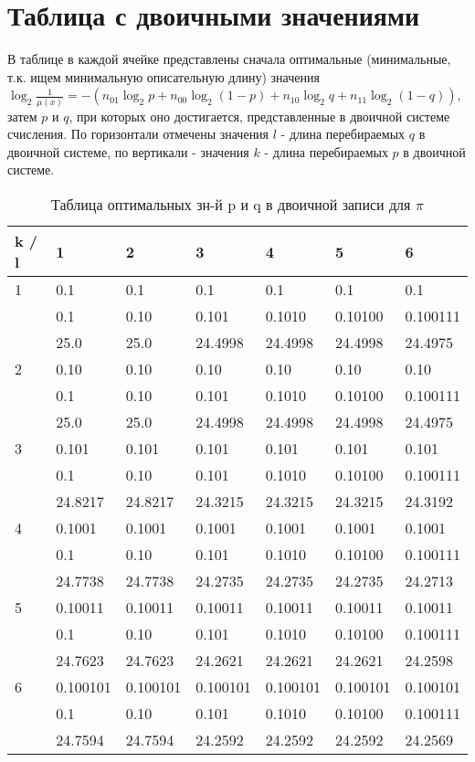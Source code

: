 \documentclass[12pt]{article}
\begin{document}
	
	\section*{Таблица с двоичными значениями}
	В таблице в каждой ячейке представлены сначала оптимальные (минимальные, т.к. ищем минимальную описательную длину) значения $\log_2{\frac{1}{\mu(x)}}=-(n_{01}\log_2{p}+n_{00}\log_2{(1-p)}+n_{10}\log_2{q}+n_{11}\log_2{(1-q)})$, затем $p$ и $q$, при которых оно достигается, представленные в двоичной системе счисления. По горизонтали отмечены значения $l$ - длина перебираемых $q$  в двоичной системе, по вертикали - значения $k$ - длина перебираемых $p$  в двоичной системе.
	
	\begin{table}[!h]
		\caption{Таблица оптимальных зн-й p и q в двоичной записи для $\pi$}
		\label{sometable}
		\begin{center}
			\begin{tabular}{|l|l|l|l|l|l|l|}
				\hline
				k / l &1 & 2 & 3 & 4 & 5 & 6\\
				\hline
				1 & 0.1& 0.1& 0.1& 0.1& 0.1& 0.1\\
				& 0.1& 0.10& 0.101& 0.1010& 0.10100& 0.100111\\
				& 25.0& 25.0& 24.4998& 24.4998& 24.4998& 24.4975\\
				\hline
				2 & 0.10& 0.10& 0.10& 0.10& 0.10& 0.10\\
				& 0.1& 0.10& 0.101& 0.1010& 0.10100& 0.100111\\
				& 25.0& 25.0& 24.4998& 24.4998& 24.4998& 24.4975\\
				\hline
				3 & 0.101& 0.101& 0.101& 0.101& 0.101& 0.101\\
				& 0.1& 0.10& 0.101& 0.1010& 0.10100& 0.100111\\
				& 24.8217& 24.8217& 24.3215& 24.3215& 24.3215& 24.3192\\
				\hline
				4 & 0.1001& 0.1001& 0.1001& 0.1001& 0.1001& 0.1001\\
				& 0.1& 0.10& 0.101& 0.1010& 0.10100& 0.100111\\
				& 24.7738& 24.7738& 24.2735& 24.2735& 24.2735& 24.2713\\
				\hline
				5 & 0.10011& 0.10011& 0.10011& 0.10011& 0.10011& 0.10011\\
				& 0.1& 0.10& 0.101& 0.1010& 0.10100& 0.100111\\
				& 24.7623& 24.7623& 24.2621& 24.2621& 24.2621& 24.2598\\
				\hline
				6 & 0.100101& 0.100101& 0.100101& 0.100101& 0.100101& 0.100101\\
				& 0.1& 0.10& 0.101& 0.1010& 0.10100& 0.100111\\
				& 24.7594& 24.7594& 24.2592& 24.2592& 24.2592& 24.2569\\
				\hline
			\end{tabular}
		\end{center}
	\end{table}
	
\end{document}
